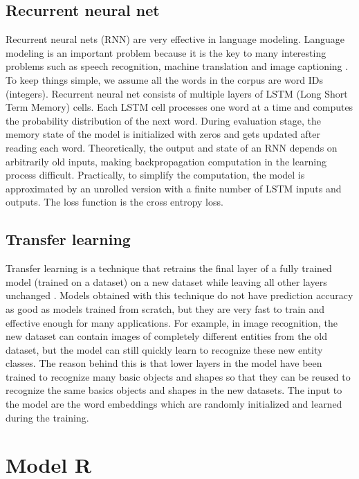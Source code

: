 \documentclass[12pt]{WSUThesis}
\theoremstyle{definition}
\begin{document}
\section{Recurrent neural net}
Recurrent neural nets (RNN) are very effective in language modeling.
Language modeling is an important problem because it is the key to many interesting problems such as speech recognition, machine translation and image captioning \cite{zaremba2014recurrent}.
To keep things simple, we assume all the words in the corpus are word IDs (integers).
Recurrent neural net consists of multiple layers of LSTM (Long Short Term Memory) cells. Each LSTM cell processes one word at a time and computes the probability distribution of the next word.
During evaluation stage, the memory state of the model is initialized with zeros and gets updated after reading each word.
Theoretically, the output and state of an RNN depends on arbitrarily old inputs, making backpropagation computation in the learning process difficult.
Practically, to simplify the computation, the model is approximated by an unrolled version with a finite number of LSTM inputs and outputs.
The loss function is the cross entropy loss.

\section{Transfer learning}
Transfer learning is a technique that retrains the final layer of a fully trained model (trained on a dataset) on a new dataset while leaving all other layers unchanged \cite{donahue2014decaf}. Models obtained with this technique do not have prediction accuracy as good as models trained from scratch, but they are very fast to train and effective enough for many applications. For example, in image recognition, the new dataset can contain images of completely different entities from the old dataset, but the model can still quickly learn to recognize these new entity classes. The reason behind this is that lower layers in the model have been trained to recognize many basic objects and shapes so that they can be reused to recognize the same basics objects and shapes in the new datasets.
The input to the model are the word embeddings which are randomly initialized and learned during the training.

\chapter{Model R}
\end{document}
